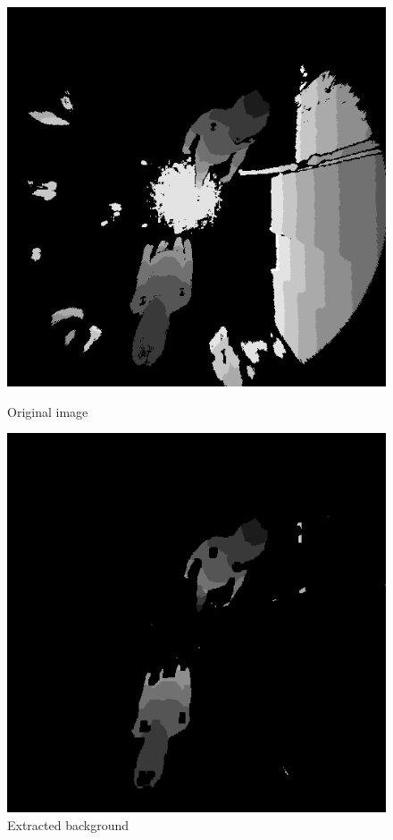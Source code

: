 \documentclass[conference]{IEEEtran}
\begin{document}
\begin{figure}[ht!]
    \centering
    \begin{minipage}[b]{0.22\textwidth}
        \centering
        \includegraphics[width=\textwidth]{Images/classical/163.png}
        \caption{Original image}\label{fig:NetRes3}
    \end{minipage}
    \hfill
    \begin{minipage}[b]{0.22\textwidth}
        \centering
        \includegraphics[width=\textwidth]{Images/classical/163-no-back.png}
        \caption{Extracted background}\label{fig:NetRes3}
    \end{minipage}
\end{figure}
\end{document}
